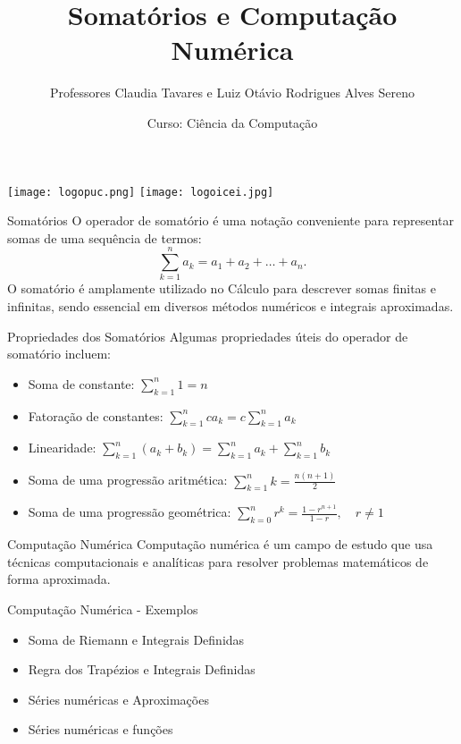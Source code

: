 \documentclass{beamer}
\title{Somatórios e Computação Numérica}
\author{Professores Claudia Tavares e Luiz Otávio Rodrigues Alves Sereno}
\date{Curso: Ciência da Computação}
\begin{document}
\begin{frame}
    \titlepage
    \vfill
    \begin{center}
    \vspace{-0.9cm}
        \texttt{[image: logopuc.png]} \hspace{1.4cm}
        \texttt{[image: logoicei.jpg]}
    \end{center}
\end{frame}

\begin{frame}{Somatórios}
    O operador de somatório é uma notação conveniente para representar somas de uma sequência de termos:
    \[
        \sum_{k=1}^{n} a_k = a_1 + a_2 + \dots + a_n.
    \]
    O somatório é amplamente utilizado no Cálculo para descrever somas finitas e infinitas, sendo essencial em diversos métodos numéricos e integrais aproximadas.
\end{frame}

\begin{frame}{Propriedades dos Somatórios}
    Algumas propriedades úteis do operador de somatório incluem:
    \begin{itemize}
    \item Soma de constante: \( \displaystyle \sum_{k=1}^{n} 1 = n\)
        \item Fatoração de constantes: \( \displaystyle \sum_{k=1}^{n} c a_k = c \sum_{k=1}^{n} a_k \)
        \item Linearidade: \( \displaystyle \sum_{k=1}^{n} (a_k + b_k) = \sum_{k=1}^{n} a_k + \sum_{k=1}^{n} b_k \)
        \item Soma de uma progressão aritmética: \( \displaystyle \sum_{k=1}^{n} k = \frac{n(n+1)}{2} \)
        \item Soma de uma progressão geométrica: \( \displaystyle \sum_{k=0}^{n} r^k = \frac{1 - r^{n+1}}{1 - r}, \quad r \neq 1 \)
    \end{itemize}
\end{frame}


\begin{frame}{Computação Numérica}
    Computação numérica é um campo de estudo que usa técnicas computacionais e analíticas para resolver problemas matemáticos de forma aproximada. 
\end{frame}

\begin{frame}{Computação Numérica - Exemplos}
    \begin{itemize}
        \item Soma de Riemann e Integrais Definidas
        \item Regra dos Trapézios e Integrais Definidas
        \item Séries numéricas e Aproximações
        \item Séries numéricas e funções
    \end{itemize}
\end{frame}
\end{document}
